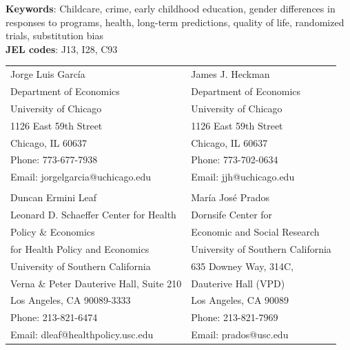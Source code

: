 \noindent \textbf{Keywords}: Childcare, crime, early childhood education, gender differences in responses to programs, health, long-term predictions, quality of life, randomized trials, substitution bias \\
\noindent \textbf{JEL codes}: J13, I28, C93

\bigskip

\begin{tabular}{ll}
Jorge Luis Garc\'{i}a                                       & James J. Heckman \\
Department of Economics                                & Department of Economics \\
University of Chicago                                       & University of Chicago \\
1126 East 59th Street                                     & 1126 East 59th Street \\
Chicago, IL 60637                                           & Chicago, IL 60637 \\
Phone: 773-677-7938                                     & Phone: 773-702-0634  \\
Email: jorgelgarcia@uchicago.edu                       & Email: jjh@uchicago.edu \\
                                                                       & \\
Duncan Ermini Leaf                                 & Mar\'{i}a Jos\'{e} Prados \\
Leonard D. Schaeffer Center for Health              & Dornsife Center for  \\
Policy \& Economics                                 & Economic and Social Research \\
for Health Policy and Economics                     & University of Southern California \\
University of Southern California                    & 635 Downey Way, 314C,  \\
Verna \& Peter Dauterive Hall, Suite 210            & Dauterive Hall (VPD) \\
Los Angeles, CA 90089-3333                        & Los Angeles, CA 90089 \\
Phone: 213-821-6474                                & Phone: 213-821-7969 \\
Email: dleaf@healthpolicy.usc.edu                 & Email: prados@usc.edu \\

\end{tabular}


